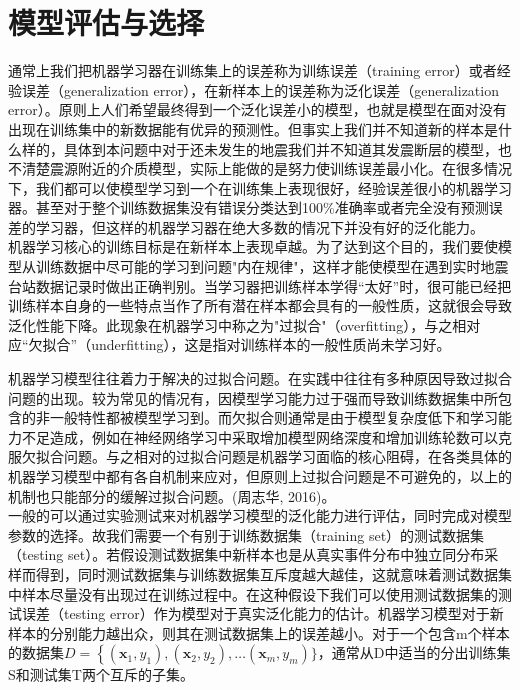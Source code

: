\section{模型评估与选择}
 \indent 通常上我们把机器学习器在训练集上的误差称为训练误差（training error）或者经验误差（generalization error），在新样本上的误差称为泛化误差（generalization error）。原则上人们希望最终得到一个泛化误差小的模型，也就是模型在面对没有出现在训练集中的新数据能有优异的预测性。但事实上我们并不知道新的样本是什么样的，具体到本问题中对于还未发生的地震我们并不知道其发震断层的模型，也不清楚震源附近的介质模型，实际上能做的是努力使训练误差最小化。在很多情况下，我们都可以使模型学习到一个在训练集上表现很好，经验误差很小的机器学习器。甚至对于整个训练数据集没有错误分类达到100\%准确率或者完全没有预测误差的学习器，但这样的机器学习器在绝大多数的情况下并没有好的泛化能力。\\
 \indent 机器学习核心的训练目标是在新样本上表现卓越。为了达到这个目的，我们要使模型从训练数据中尽可能的学习到问题"内在规律"，这样才能使模型在遇到实时地震台站数据记录时做出正确判别。当学习器把训练样本学得“太好”时，很可能已经把训练样本自身的一些特点当作了所有潜在样本都会具有的一般性质，这就很会导致泛化性能下降。此现象在机器学习中称之为"过拟合"（overfitting），与之相对应“欠拟合”（underfitting），这是指对训练样本的一般性质尚未学习好。
 
 



 \indent 机器学习模型往往着力于解决的过拟合问题。在实践中往往有多种原因导致过拟合问题的出现。较为常见的情况有，因模型学习能力过于强而导致训练数据集中所包含的非一般特性都被模型学习到。而欠拟合则通常是由于模型复杂度低下和学习能力不足造成，例如在神经网络学习中采取增加模型网络深度和增加训练轮数可以克服欠拟合问题。与之相对的过拟合问题是机器学习面临的核心阻碍，在各类具体的机器学习模型中都有各自机制来应对，但原则上过拟合问题是不可避免的，以上的机制也只能部分的缓解过拟合问题。(周志华, 2016)。\\
 \indent 一般的可以通过实验测试来对机器学习模型的泛化能力进行评估，同时完成对模型参数的选择。故我们需要一个有别于训练数据集（training set）的测试数据集（testing set）。若假设测试数据集中新样本也是从真实事件分布中独立同分布采样而得到，同时测试数据集与训练数据集互斥度越大越佳，这就意味着测试数据集中样本尽量没有出现过在训练过程中。在这种假设下我们可以使用测试数据集的测试误差（testing error）作为模型对于真实泛化能力的估计。机器学习模型对于新样本的分别能力越出众，则其在测试数据集上的误差越小。对于一个包含m个样本的数据集$D=\left\{\left(\boldsymbol{x}_{1}, y_{1}\right),\left(\boldsymbol{x}_{2}, y_{2}\right), \ldots\right.\left(\boldsymbol{x}_{m}, y_{m}\right) \}$，通常从D中适当的分出训练集S和测试集T两个互斥的子集。\\

